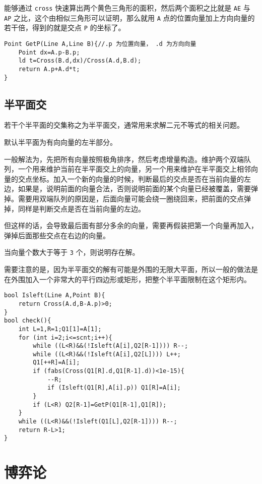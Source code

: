 \documentclass[UTF-8]{ctexart}
\begin{document}
	能够通过 \texttt{cross} 快速算出两个黄色三角形的面积，然后两个面积之比就是 \texttt{AE} 与 \texttt{AP} 之比，这个由相似三角形可以证明，那么就用 \texttt{A} 点的位置向量加上方向向量的若干倍，得到的就是交点 \texttt{P} 的坐标了。
\begin{verbatim}
Point GetP(Line A,Line B){//.p 为位置向量， .d 为方向向量
    Point dx=A.p-B.p;
    ld t=Cross(B.d,dx)/Cross(A.d,B.d);
    return A.p+A.d*t;
}
\end{verbatim}
	
	\subsection{半平面交}
	若干个半平面的交集称之为半平面交，通常用来求解二元不等式的相关问题。  
	
	默认半平面为有向向量的左半部分。
	
	一般解法为，先把所有向量按照极角排序，然后考虑增量构造。维护两个双端队列，一个用来维护当前在半平面交上的向量，另一个用来维护在半平面交上相邻向量的交点坐标。加入一个新的向量的时候，判断最后的交点是否在当前向量的左边，如果是，说明前面的向量合法，否则说明前面的某个向量已经被覆盖，需要弹掉。需要用双端队列的原因是，后面向量可能会绕一圈绕回来，把前面的交点弹掉，同样是判断交点是否在当前向量的左边。  
	
	但这样的话，会导致最后面有部分多余的向量，需要再假装把第一个向量再加入，弹掉后面那些交点在右边的向量。  
	
	当向量个数大于等于 \texttt{3} 个，则说明存在解。
	
	需要注意的是，因为半平面交的解有可能是外围的无限大平面，所以一般的做法是在外围加入一个非常大的平行四边形或矩形，把整个半平面限制在这个矩形内。
	
\begin{verbatim}
bool Isleft(Line A,Point B){
    return Cross(A.d,B-A.p)>0;
}
bool check(){
    int L=1,R=1;Q1[1]=A[1];
    for (int i=2;i<=scnt;i++){
        while ((L<R)&&(!Isleft(A[i],Q2[R-1]))) R--;
        while ((L<R)&&(!Isleft(A[i],Q2[L]))) L++;
        Q1[++R]=A[i];
        if (fabs(Cross(Q1[R].d,Q1[R-1].d))<1e-15){
            --R;
            if (Isleft(Q1[R],A[i].p)) Q1[R]=A[i];
        }
        if (L<R) Q2[R-1]=GetP(Q1[R-1],Q1[R]);
    }
    while ((L<R)&&(!Isleft(Q1[L],Q2[R-1]))) R--;
    return R-L>1;
}
\end{verbatim}
	\newpage
	\section{博弈论}
\end{document}

